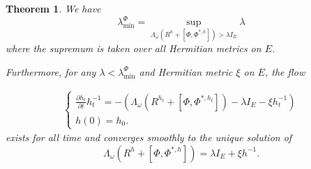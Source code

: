 \documentclass[11pt]{amsart}
\newtheorem{theorem}{Theorem}[section]
\numberwithin{equation}{section}
\theoremstyle{remark}
\newcommand{\pa}{\partial}
\newcommand{\lb}{\left (}
\newcommand{\rb}{\right )}
\newcommand{\lsb}{\left [}
\newcommand{\rsb}{\right ]}
\begin{document}
\begin{theorem}\label{b200}
We have
\[
\lambda_{\min}^\Phi=\sup_{\Lambda_\omega \lb R^h+\lsb \Phi,\Phi^{*,h}\rsb\rb>\lambda I_E} \lambda
\]
where the supremum is taken over all Hermitian metrics on $E$. 

Furthermore, for any $\lambda<\lambda_{\min}^{\Phi}$ and Hermitian metric $\xi$ on $E$, the flow

\begin{eqnarray}\label{b100}
\begin{cases}
\frac{\pa h_t}{\pa t}h_t^{-1}= -\lb \Lambda_\omega\lb R^{h_t}+\lsb \Phi,\Phi^{*,h_t}\rsb\rb-\lambda I_E-\xi h_t^{-1}\rb\\
h(0)=h_0.
\end{cases}
\end{eqnarray}
exists for all time and converges smoothly to the unique solution of \[ \Lambda_\omega \lb R^h+\lsb \Phi,\Phi^{*,h}\rsb\rb=\lambda I_E+\xi h^{-1}.\]
\end{theorem}
\end{document}
